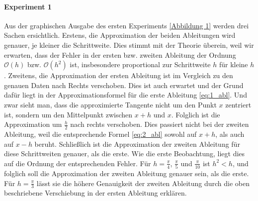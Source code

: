 \documentclass[smallheadings]{scrartcl}
\begin{document}
\paragraph{Experiment 1}
Aus der graphischen Ausgabe des ersten Experiments \ref{Abbildung 1} werden drei Sachen ersichtlich. Erstens, die Approximation der beiden Ableitungen wird genauer, je kleiner die Schrittweite. Dies stimmt mit der Theorie überein, weil wir erwarten, dass der Fehler in der ersten bzw. zweiten Ableitung der Ordnung $\mathcal{O}(h)$ bzw. $\mathcal{O}(h^2)$ ist, insbesondere proportional zur Schrittweite $h$ für kleine $h$. \newline
Zweitens, die Approximation der ersten Ableitung ist im Vergleich zu den genauen Daten nach Rechts verschoben. Dies ist auch erwartet und der Grund dafür liegt in der Approximationsformel für die erste Ableitung \ref{eq:1_abl}. Und zwar sieht man, dass die approximierte Tangente nicht um den Punkt $x$ zentriert ist, sondern um den Mittelpunkt zwischen $x+h$ und $x$. Folglich ist die Approximation um $\frac{h}{2}$ nach rechts verschoben. Dies passiert nicht bei der zweiten Ableitung, weil die entsprechende Formel \ref{eq:2_abl} sowohl auf $x+h$, als auch auf $x-h$ beruht. \newline
Schließlich ist die Approximation der zweiten Ableitung für diese Schrittweiten genauer, als die erste. Wie die erste Beobachtung, liegt dies auf die Ordnung der entsprechenden Fehler. Für $h=\frac{\pi}{4}$, $\frac{\pi}{5}$ und $\frac{\pi}{10}$ ist $h^2<h$, und folglich soll die Approximation der zweiten Ableitung genauer sein, als die erste. Für $h=\frac{\pi}{3}$ lässt sie die höhere Genauigkeit der zweiten Ableitung durch die oben beschriebene Verschiebung in der ersten Ableitung erklären. 
\end{document}
